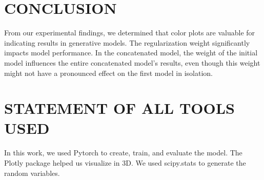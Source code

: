 \documentclass{article}
\begin{document}
\section{CONCLUSION}
\label{sec:conclusion}

From our experimental findings, we determined that color plots are valuable for indicating results in generative models. 
The regularization weight significantly impacts model performance. 
In the concatenated model, the weight of the initial model influences the entire concatenated model's results, even though this weight might not have a pronounced effect on the first model in isolation.

\section{STATEMENT OF ALL TOOLS USED}
\label{sec:statementofalltoolsused}

In this work, we used Pytorch to create, train, and evaluate the model. 
The Plotly package helped us visualize in 3D. 
We used scipy.stats to generate the random variables.



\vfill\pagebreak



\end{document}

